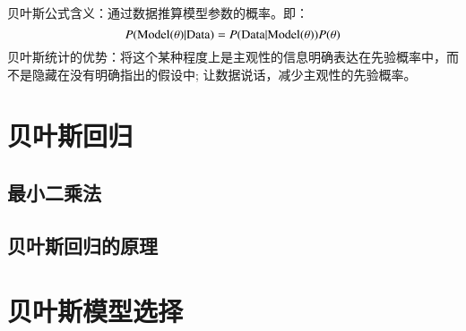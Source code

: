 贝叶斯公式含义：通过数据推算模型参数的概率。即：
\begin{equation}
    P({\rm{Model}} (\theta)|{\rm{Data}})=
    P({\rm{Data}}|{\rm{Model}}(\theta))P(\theta)
\end{equation}
贝叶斯统计的优势：将这个某种程度上是主观性的信息明确表达在先验概率中，而不是隐藏在没有明确指出的假设中; 让数据说话，减少主观性的先验概率。





\section{贝叶斯回归}
\subsection{最小二乘法}

\subsection{贝叶斯回归的原理}


\section{贝叶斯模型选择}

